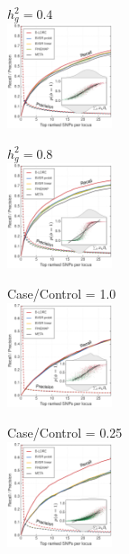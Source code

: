 \documentclass[a0paper,portrait,debug]{baposter}
\begin{document}
\begin{poster}
{\begin{multicols}{4}
  {\begin{center}
   $h_g^2 = 0.4$\\
   \includegraphics[width=0.23\textwidth]{pip_prc_normal_h04_c2_l100_cred.pdf}
   \end{center}
  }
  {\begin{center}
   $h_g^2 = 0.8$ \\
   \includegraphics[width=0.23\textwidth]{pip_prc_normal_h08_c2_l100_cred.pdf}
   \end{center}
  }
  {\begin{center}
   Case/Control = 1.0 \\
   \includegraphics[width=0.23\textwidth]{pip_prc_normal_h04_c2_l100_fixcase_cred.pdf}
   \end{center}
  }
  {\begin{center}
   Case/Control = 0.25 \\
   \includegraphics[width=0.23\textwidth]{pip_prc_normal_h04_c2_l025_fixcase_cred.pdf}
   \end{center}
  }
\end{multicols}
}


\end{poster}
\end{document}
